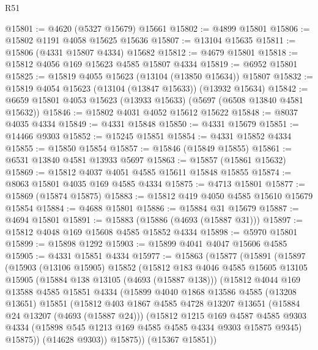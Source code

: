 \begin{lexlean}{R51}
\begin{coremodule}
@15801 := @4620 (@5327 @15679) @15661
@15802 := @4899 @15801
@15806 := @15802 @1191 @4058 @15625 @15636
@15807 := @13104 @15635
@15811 := @15806 (@4331 @15807 @4334) @15682
@15812 := @4679 @15801
@15818 := @15812 @4056 @169 @15623 @4585 @15807 @4334
@15819 := @6952 @15801
@15825 := @15819 @4055 @15623 (@13104 (@13850 @15634)) @15807
@15832 := @15819 @4054 @15623 (@13104 (@13847 @15633)) (@13932 @15634)
@15842 := @6659 @15801 @4053 @15623 (@13933 @15633) (@5697 (@6508 @13840 @4581 @15632))
@15846 := @15802 @4031 @4052 @15612 @15622
@15848 := @8037 @4035 @4334
@15849 := @4331 @15848
@15850 := @4331 @15679
@15851 := @14466 @9303
@15852 := @15245 @15851
@15854 := @4331 @15852 @4334
@15855 := @15850 @15854
@15857 := @15846 (@15849 @15855)
@15861 := @6531 @13840 @4581 @13933 @5697
@15863 := @15857 (@15861 @15632)
@15869 := @15812 @4037 @4051 @4585 @15611 @15848 @15855
@15874 := @8063 @15801 @4035 @169 @4585 @4334
@15875 := @4713 @15801
@15877 := @15869 (@15874 @15875)
@15883 := @15812 @419 @4050 @4585 @15610 @15679 @15854
@15884 := @4688 @15801
@15886 := @15884 @31 @15679
@15887 := @4694 @15801
@15891 := @15883 (@15886 (@4693 (@15887 @31)))
@15897 := @15812 @4048 @169 @15608 @4585 @15852 @4334
@15898 := @5970 @15801
@15899 := @15898 @1292
@15903 := @15899 @4041 @4047 @15606 @4585
@15905 := @4331 @15851 @4334
@15977 := @15863
    (@15877
      (@15891
        (@15897
          (@15903
            (@13106 @15905)
            @15852
            (@15812
              @183
              @4046
              @4585
              @15605
              @13105
              @15905
              (@15884 @138 @13105 (@4693 (@15887 @138)))
              (@15812
                @4044
                @169
                @13588
                @4585
                @15851
                @4334
                (@15899
                  @4040
                  @1868
                  @13586
                  @4585
                  (@13208 @13651)
                  @15851
                  (@15812
                    @403
                    @1867
                    @4585
                    @4728
                    @13207
                    @13651
                    (@15884 @24 @13207 (@4693 (@15887 @24)))
                    (@15812
                      @1215
                      @169
                      @4587
                      @4585
                      @9303
                      @4334
                      (@15898 @545 @1213 @169 @4585 @4585 @4334 @9303 @15875 @9345)
                      @15875))
                  (@14628 @9303))
                @15875))
            (@15367 @15851))

\end{coremodule}
\end{lexlean}
